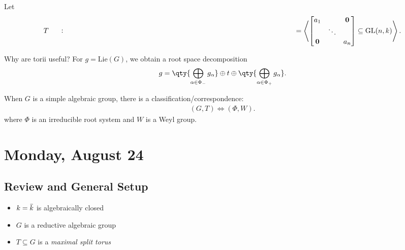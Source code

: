\begin{example}

\begin{example}

Let
\begin{align*}   T \mathrel{\vcenter{:}}= \left\langle{ \begin{bmatrix} a_1 &  & \mathbf 0\\  & \ddots &  \\ \mathbf 0 &  & a_n \end{bmatrix} \subseteq \operatorname{GL}(n ,k) }\right\rangle .\end{align*}

\end{example}

\end{example}

\begin{remark}

\begin{remark}

Why are torii useful? For \(g = \mathrm{Lie}(G)\), we obtain a root
space decomposition
\begin{align*}   g =  \qty{\bigoplus_{\alpha \in \Phi_- }g_\alpha} \oplus  t \oplus \qty{\bigoplus_{\alpha \in \Phi_+ }g_\alpha}  .\end{align*}

When \(G\) is a simple algebraic group, there is a
classification/correspondence:
\begin{align*}   (G, T) \iff (\Phi, W) .\end{align*} where \(\Phi\) is
an irreducible root system and \(W\) is a Weyl group.

\end{remark}

\end{remark}

\hypertarget{monday-august-24}{%
\section{Monday, August 24}\label{monday-august-24}}

\hypertarget{review-and-general-setup}{%
\subsection{Review and General Setup}\label{review-and-general-setup}}

\begin{itemize}
\tightlist
\item
  \(k = \mkern 1.5mu\overline{\mkern-1.5muk\mkern-1.5mu}\mkern 1.5mu\)
  is algebraically closed
\item
  \(G\) is a reductive algebraic group
\item
  \(T\subseteq G\) is a \emph{maximal split torus}
\end{itemize}

